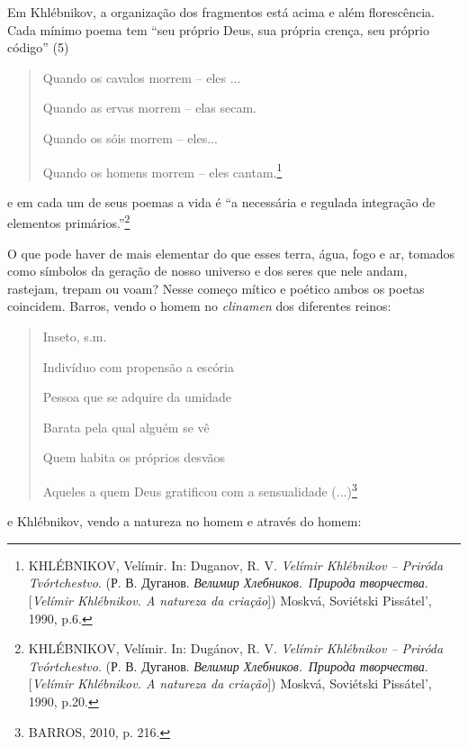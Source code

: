 Em Khlébnikov, a organização dos fragmentos está acima e além
florescência. Cada mínimo poema tem ``seu próprio Deus, sua própria
crença, seu próprio código'' (5)

\begin{quote}
Quando os cavalos morrem -- eles ...

Quando as ervas morrem -- elas secam.

Quando os sóis morrem -- eles...

Quando os homens morrem -- eles cantam.\footnote{KHLÉBNIKOV, Velímir.
  In: Duganov, R. V. \emph{Velímir Khlébnikov -- Priróda Tvórtchestvo}.
  (Р. В. Дуганов. \emph{Велимир Хлебников}.~\emph{Природа творчества}.
  {[}\emph{Velímir Khlébnikov. A natureza da criação}{]}) Moskvá,
  Soviétski Pissátel', 1990, p.6.}
\end{quote}

e em cada um de seus poemas a vida é ``a necessária e regulada
integração de elementos primários.''\footnote{KHLÉBNIKOV, Velímir. In:
  Dugánov, R. V. \emph{Velímir Khlébnikov -- Priróda Tvórtchestvo}. (Р.
  В. Дуганов. \emph{Велимир Хлебников}.~\emph{Природа творчества}.
  {[}\emph{Velímir Khlébnikov. A natureza da criação}{]}) Moskvá,
  Soviétski Pissátel', 1990, p.20.}

O que pode haver de mais elementar do que esses terra, água, fogo e ar,
tomados como símbolos da geração de nosso universo e dos seres que nele
andam, rastejam, trepam ou voam? Nesse começo mítico e poético ambos os
poetas coincidem. Barros, vendo o homem no \emph{clinamen} dos
diferentes reinos:

\begin{quote}
Inseto, s.m.

Indivíduo com propensão a escória

Pessoa que se adquire da umidade

Barata pela qual alguém se vê

Quem habita os próprios desvãos

Aqueles a quem Deus gratificou com a sensualidade (...)\footnote{BARROS,
  2010, p. 216.}
\end{quote}

e Khlébnikov, vendo a natureza no homem e através do homem:


